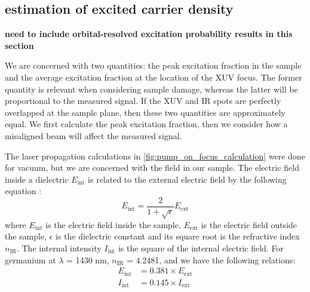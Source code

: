 \subsection{estimation of excited carrier density}

\textbf{need to include orbital-resolved excitation probability results in this section}

We are concerned with two quantities: the peak excitation fraction in the sample and the average excitation fraction at the location of the XUV focus. The former quantity is relevant when considering sample damage, whereas the latter will be proportional to the measured signal. If the XUV and IR spots are perfectly overlapped at the sample plane, then these two quantities are approximately equal. We first calculate the peak excitation fraction, then we consider how a misaligned beam will affect the measured signal.

The laser propagation calculations in \cref{fig:pump_on_focus_calculation} were done for vacuum, but we are concerned with the field in our sample. The electric field inside a dielectric $E_{\text{int}}$ is related to the external electric field by the following equation \cite{schultzeAttosecondBandgapDynamics2014}:
\begin{equation}
E_{\text{int}} = \frac{2}{1+\sqrt{\epsilon}} E_{\text{ext}}
\label{eqn:internal_external_Efield}
\end{equation}
where $E_{\text{int}}$ is the electric field inside the sample, $E_{\text{ext}}$ is the electric field outside the sample, $\epsilon$ is the dielectric constant and its square root is the refractive index $n_{\text{IR}}$. The internal intensity $I_{\text{int}}$ is the square of the internal electric field. For germanium at $\lambda$ = 1430 nm, $n_{\text{IR}}$ = 4.2481, and we have the following relations:
\begin{equation}
\begin{aligned}
E_{\text{int}} &= 0.381 \times E_{\text{ext}} \\
I_{\text{int}} &= 0.145 \times I_{\text{ext}}
\end{aligned}
\end{equation}

